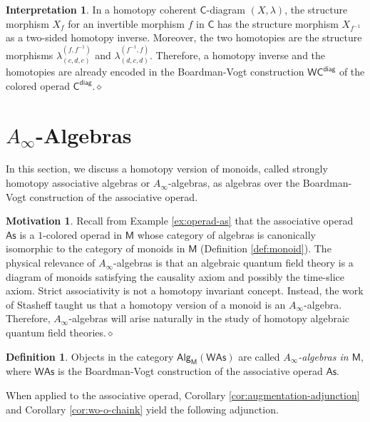\documentclass{amsbook}
\numberwithin{section}{chapter}
\numberwithin{subsection}{section}
\numberwithin{equation}{section}
\theoremstyle{plain}
\theoremstyle{definition}
\newtheorem{definition}[equation]{Definition}
\newtheorem{interpretation}[equation]{Interpretation}
\newtheorem{motivation}[equation]{Motivation}
\newcommand{\C}{\mathsf{C}}
\newcommand{\M}{\mathsf{M}}
\newcommand{\W}{\mathsf{W}}
\newcommand{\dqed}{\hfill$\diamond$}
\newcommand{\inv}[1]{{#1}^{-1}}
\newcommand{\finverse}{\inv{f}}
\newcommand{\As}{\mathsf{As}}
\newcommand{\Was}{\W\As}
\newcommand{\Cdiag}{\C^{\mathsf{diag}}}
\newcommand{\Wcdiag}{\W\Cdiag}
\newcommand{\alg}{\mathsf{Alg}}
\newcommand{\algm}{\alg_{\M}}
\begin{document}
\begin{interpretation}
In a homotopy coherent $\C$-diagram $(X,\lambda)$, the structure morphism $X_f$ for an invertible morphism $f$ in $\C$ has the structure morphism $X_{\finverse}$ as a two-sided  homotopy inverse.  Moreover, the two homotopies are the structure morphisms $\lambda^{(f,\finverse)}_{(c,d,c)}$ and $\lambda^{(\finverse,f)}_{(d,c,d)}$.  Therefore, a homotopy inverse and the homotopies are already encoded in the Boardman-Vogt construction $\Wcdiag$ of the colored operad $\Cdiag$.\dqed
\end{interpretation}


\section{$A_\infty$-Algebras}\label{sec:ainfinity-algebra}

In this section, we discuss a homotopy version of monoids, called strongly homotopy associative algebras or $A_{\infty}$-algebras, as algebras over the Boardman-Vogt construction of the associative operad.  

\begin{motivation} Recall from Example \ref{ex:operad-as} that the associative operad $\As$ is a $1$-colored operad in $\M$ whose category of algebras is canonically isomorphic to the category of monoids in $\M$ (Definition \ref{def:monoid}).  The physical relevance of $A_\infty$-algebras is that an algebraic quantum field theory is a diagram of monoids satisfying the causality axiom and possibly the time-slice axiom.  Strict associativity is not a homotopy invariant concept.  Instead, the work of Stasheff \cite{stasheff} taught us that a homotopy version of a monoid is an $A_\infty$-algebra.  Therefore, $A_\infty$-algebras will arise naturally in the study of homotopy algebraic quantum field theories.\dqed\end{motivation}

\begin{definition}\label{def:ainfinity-algebra}
Objects in the category $\algm(\Was)$ are called \emph{$A_\infty$-algebras in $\M$}, where $\Was$ is the Boardman-Vogt construction of the associative operad $\As$.
\end{definition}

When applied to the associative operad, Corollary \ref{cor:augmentation-adjunction} and  Corollary \ref{cor:wo-o-chaink} yield the following adjunction.
\end{document}
